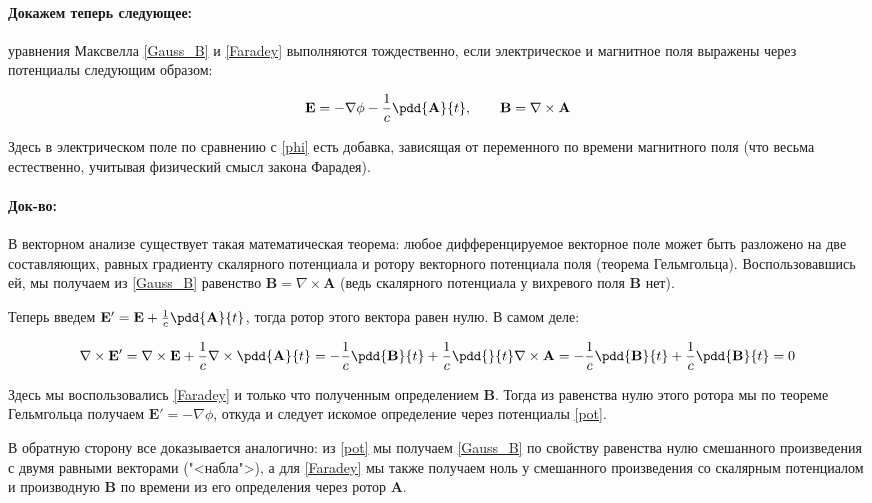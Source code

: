 \documentclass[12pt]{kiarticle}
\begin{document}
\paragraph*{Докажем теперь следующее:} уравнения Максвелла \eqref{Gauss_B} и \eqref{Faradey} выполняются тождественно, если электрическое и магнитное поля выражены через потенциалы следующим образом:

\begin{equation}\label{pot}
\mathbf{E} = - \nabla \phi  - \dfrac{1}{c} \pdd{\mathbf{A}}{t}, \qquad \mathbf{B} = \nabla \times \mathbf{A}
\end{equation}

Здесь в электрическом поле по сравнению с \eqref{phi} есть добавка, зависящая от переменного по времени магнитного поля (что весьма естественно, учитывая физический смысл закона Фарадея).

\paragraph*{Док-во:} В векторном анализе существует такая математическая теорема: любое дифференцируемое векторное поле может быть разложено на две составляющих, равных градиенту скалярного потенциала и ротору векторного потенциала поля (теорема Гельмгольца). Воспользовавшись ей, мы получаем из \eqref{Gauss_B} равенство $ \mathbf{B} = \nabla \times \mathbf{A} $ (ведь скалярного потенциала у вихревого поля $ \mathbf{B} $ нет). 

Теперь введем $ \mathbf{E}' = \mathbf{E} + \frac{1}{c} \pdd{\mathbf{A}}{t} $, тогда ротор этого вектора равен нулю. В самом деле:

\begin{equation}\label{}
\nabla \times \mathbf{E}' = \nabla \times \mathbf{E} + \dfrac{1}{c}\nabla \times \pdd{\mathbf{A}}{t} = -\dfrac{1}{c} \pdd{\mathbf{B}}{t} +   \dfrac{1}{c}\pdd{}{t} \nabla \times \mathbf{A} = -\dfrac{1}{c} \pdd{\mathbf{B}}{t} + \dfrac{1}{c} \pdd{\mathbf{B}}{t} = 0
\end{equation}

Здесь мы воспользовались \eqref{Faradey} и только что полученным определением $ \mathbf{B} $. Тогда из равенства нулю этого ротора мы по теореме Гельмгольца получаем $ \mathbf{E}' = - \nabla \phi $, откуда и следует искомое определение через потенциалы \eqref{pot}.

В обратную сторону все доказывается аналогично: из \eqref{pot} мы получаем \eqref{Gauss_B} по свойству равенства нулю смешанного произведения с двумя равными векторами ("<набла">), а для  \eqref{Faradey} мы также получаем ноль у смешанного произведения со скалярным потенциалом и производную $ \mathbf{B} $ по времени из его определения через ротор $ \mathbf{A} $.
\end{document}
